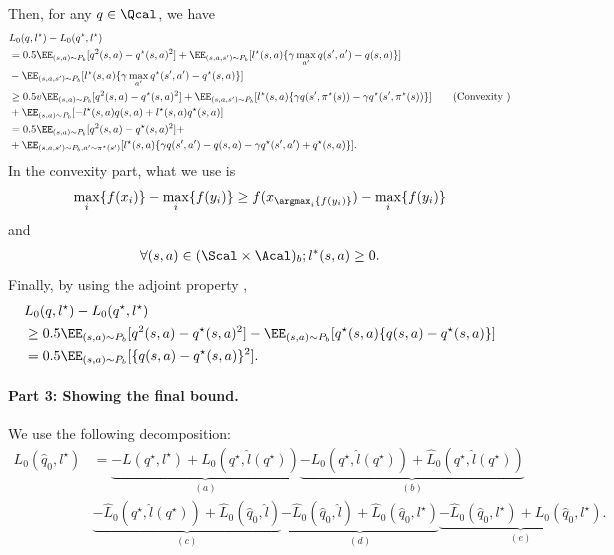 Then, for any $q \in \Qcal$, we have 
\begin{align*}
   &L_0(q,l^{\star})- L_0(q^{\star},l^{\star})\\
   &=0.5 \EE_{(s,a) \sim P_b}[q^2(s,a)-q^{\star}(s,a)^2] +\EE_{(s,a,s')\sim P_b}[l^{\star}(s,a)\{\gamma \max_{a'} q(s',a')-q(s,a) \}  ] \\
   &-\EE_{(s,a,s')\sim P_b}[l^{\star}(s,a)\{\gamma  \max_{a'} q^{\star}(s',a')-q^{\star}(s,a) \}  ]  \\
   &\geq 0.5 v\EE_{(s,a) \sim P_b}[q^2(s,a)-q^{\star}(s,a)^2]  +\EE_{(s,a,s')\sim P_b}[l^{\star}(s,a) \{\gamma q(s',\pi^{\star}(s))-\gamma q^{\star}(s',\pi^{\star}(s))\} ]  \tag{Convexity }  \\
   &+\EE_{(s,a) \sim P_b}[-l^{\star}(s,a)q(s,a) + l^{\star}(s,a)q^{\star}(s,a) ] \\
   &=0.5 \EE_{(s,a) \sim P_b}[q^2(s,a)-q^{\star}(s,a)^2]+  \\
   &+ \EE_{(s,a,s')\sim P_b,a'\sim \pi^{\star}(s
')}[l^{\star}(s,a)\{\gamma q(s',a')-q(s,a) - \gamma q^{\star}(s',a') + q^{\star}(s,a) \} ]. 
\end{align*}
In the convexity part, what we use is 
\begin{align*}
   \max_i \{f(x_i)\}- \max_{i} \{f(y_i)\} \geq f(x_{\argmax_{i} \{f(y_i)\} })-\max_{i} \{f(y_i)\} 
\end{align*}
and 
\begin{align*}
   \forall (s,a)\in (\Scal \times \Acal)_b; l^{*}(s,a)\geq 0.
\end{align*}
Finally, by using the adjoint property , 
\begin{align*}
 &L_0(q,l^{\star})- L_0(q^{\star},l^{\star})\\
  &\geq 0.5 \EE_{(s,a) \sim P_b}[q^2(s,a)-q^{\star}(s,a)^2]-\EE_{(s,a) \sim P_b}[q^{\star}(s,a)\{q(s,a)-q^{\star}(s,a)\}] \\ 
   &=0.5 \EE_{(s,a) \sim P_b}[\{q(s,a)-q^{\star}(s,a) \}^2]. 
\end{align*}


\paragraph{Part 3: Showing the final bound.}

We use the following decomposition: 
\begin{align*}
    L_0(\hat q_0,l^{\star})&=  \underbrace{-L( q^{\star},l^{\star}) + L_0(q^{\star},\hat l(q^{\star}))}_{(a)} \underbrace{-L_0(q^{\star}, \hat l(q^{\star}))+\hat L_0(q^{\star}, \hat l(q^{\star}))}_{(b)} \\ 
    &\underbrace{- \hat L_0(q^{\star}, \hat l(q^{\star})) + \hat L_0(\hat q_0, \hat l)}_{(c)} \underbrace{-\hat L_0(\hat q_0, \hat l)+ \hat L_0(\hat q_0, l^{\star})}_{(d)}\underbrace{-\hat L_0(\hat q_0, l^{\star})+ L_0(\hat q_0,l^{\star})}_{(e)}. 
\end{align*}

